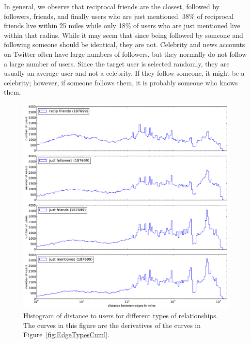 In general, we observe that reciprocal friends are the closest, followed by followers, friends,
and finally users who are just mentioned.
%
38\% of reciprocal friends live within 25 miles while only 18\% of users
who are just mentioned live within that radius.
%
While it may seem that since being followed by someone and following someone
should be identical, they are not.
%
Celebrity and news accounts on Twitter often have large numbers of followers,
but they normally do not follow a large number of users.
%
Since the target user is selected randomly, they are usually an average
user and not a celebrity.
%
If they follow someone, it might be a celebrity; however, if someone follows
them, it is probably someone who knows them.

\begin{figure}[tbh]
\centering
\includegraphics[width=.9\linewidth]{figures/edge_types_norm.pdf}
\caption{
Histogram of distance to users for different types of relationships.
The curves in this figure are the derivatives of the curves in
Figure~\ref{fig:EdgeTypesCuml}.
}
\label{fig:EdgeTypes}
\end{figure}


